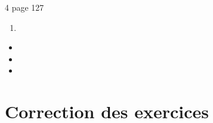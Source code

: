 \documentclass[12pt,a4paper]{article}
\begin{document}
\begin{myact}{4 page 127}
	\begin{enumerate}
		\item 
	\end{enumerate}
\end{myact}

\begin{mybilan}
	
\end{mybilan}

\begin{myexos}
	\begin{multicols}{2}
		
		\begin{itemize}
			\item \exo{}{}
			\item \exo{}{}
			\item \exo{}{}
		\end{itemize}
		
	\end{multicols}
\end{myexos}

\appendix

\newpage

\section{Correction des exercices}
\end{document}
